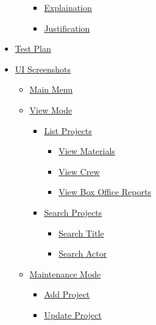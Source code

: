 \documentclass[
  english,
  a4paper,
,tablecaptionabove
]{scrartcl}
\providecommand{\tightlist}{%
  \setlength{\itemsep}{0pt}\setlength{\parskip}{0pt}}
\begin{document}
\begin{itemize}
\begin{itemize}
    \begin{itemize}
    \tightlist
    \item
      \protect\hyperlink{explaination-1}{Explaination}
    \item
      \protect\hyperlink{justification-1}{Justification}
    \end{itemize}
  \end{itemize}
\item
  \protect\hyperlink{test-plan}{Test Plan}
\item
  \protect\hyperlink{ui-screenshots}{UI Screenshots}

  \begin{itemize}
  \tightlist
  \item
    \protect\hyperlink{main-menu}{Main Menu}
  \item
    \protect\hyperlink{view-mode}{View Mode}

    \begin{itemize}
    \tightlist
    \item
      \protect\hyperlink{list-projects}{List Projects}

      \begin{itemize}
      \tightlist
      \item
        \protect\hyperlink{view-materials}{View Materials}
      \item
        \protect\hyperlink{view-crew}{View Crew}
      \item
        \protect\hyperlink{view-box-office-reports}{View Box Office
        Reports}
      \end{itemize}
    \item
      \protect\hyperlink{search-projects}{Search Projects}

      \begin{itemize}
      \tightlist
      \item
        \protect\hyperlink{search-title}{Search Title}
      \item
        \protect\hyperlink{search-actor}{Search Actor}
      \end{itemize}
    \end{itemize}
  \item
    \protect\hyperlink{maintenance-mode}{Maintenance Mode}

    \begin{itemize}
    \tightlist
    \item
      \protect\hyperlink{add-project}{Add Project}
    \item
      \protect\hyperlink{update-project}{Update Project}


\end{itemize}
\end{itemize}
\end{itemize}
\end{document}
